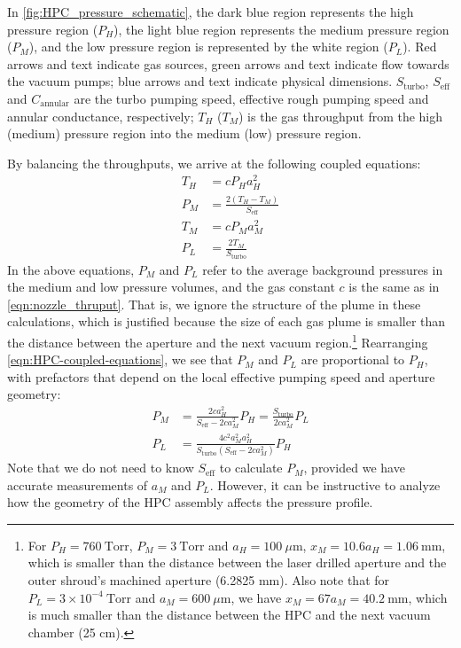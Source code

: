In \cref{fig:HPC_pressure_schematic}, the dark blue region represents the high pressure region ($P_H$), the light blue region represents the medium pressure region ($P_M$), and the low pressure region is represented by the white region ($P_L$). Red arrows and text indicate gas sources, green arrows and text indicate flow towards the vacuum pumps; blue arrows and text indicate physical dimensions. $S_{\textrm{turbo}}$, $S_{\textrm{eff}}$ and $C_{\textrm{annular}}$ are the turbo pumping speed, effective rough pumping speed and annular conductance, respectively; $T_H$ ($T_M$) is the gas throughput from the high (medium) pressure region into the medium (low) pressure region.

By balancing the throughputs, we arrive at the following coupled equations:
\begin{equation}
\begin{aligned}
T_H &= c P_H a_H^2 \\
P_M &= \frac{2(T_H-T_M)}{S_{\textrm{eff}}} \\
T_M &= c P_M a_M^2 \\
P_L &= \frac{2 T_M}{S_{\textrm{turbo}}}
\end{aligned}
\label{eqn:HPC-coupled-equations}
\end{equation}
In the above equations, $P_M$ and $P_L$ refer to the average background pressures in the medium and low pressure volumes, and the gas constant $c$ is the same as in \cref{eqn:nozzle_thruput}. That is, we ignore the structure of the plume in these calculations, which is justified because the size of each gas plume is smaller than the distance between the aperture and the next vacuum region.\footnote{For $P_H = 760 \ \textrm{Torr}$, $P_M = 3 \ \textrm{Torr}$ and $a_H = 100 \ \mu \textrm{m}$, $x_M = 10.6 a_H = 1.06 \ \textrm{mm}$, which is smaller than the distance between the laser drilled aperture and the outer shroud's machined aperture (6.2825 mm). Also note that for $P_L = 3 \times 10^{-4} \ \textrm{Torr}$ and $a_M = 600 \ \mu \textrm{m}$, we have $x_M = 67 a_M = 40.2 \ \textrm{mm}$, which is much smaller than the distance between the HPC and the next vacuum chamber (25 cm).} Rearranging \cref{eqn:HPC-coupled-equations}, we see that $P_M$ and $P_L$ are proportional to $P_H$, with prefactors that depend on the local effective pumping speed and aperture geometry:
\begin{equation}
\begin{aligned}
P_M &=  \frac{2 c a_H^2}{S_{\textrm{eff}}-2 c a_M^2} P_H  = \frac{S_{\textrm{turbo}}}{2 c a_M^2} P_L \\
P_L &= \frac{4 c^2 a_M^2 a_H^2 }{S_{\textrm{turbo}} (S_{\textrm{eff}} - 2 c a_M^2)} P_H
\end{aligned}
\label{eqn:HPC-PM-PL}
\end{equation}
Note that we do not need to know $S_{\textrm{eff}}$ to calculate $P_M$, provided we have accurate measurements of $a_M$ and $P_L$. However, it can be instructive to analyze how the geometry of the HPC assembly affects the pressure profile.
	
